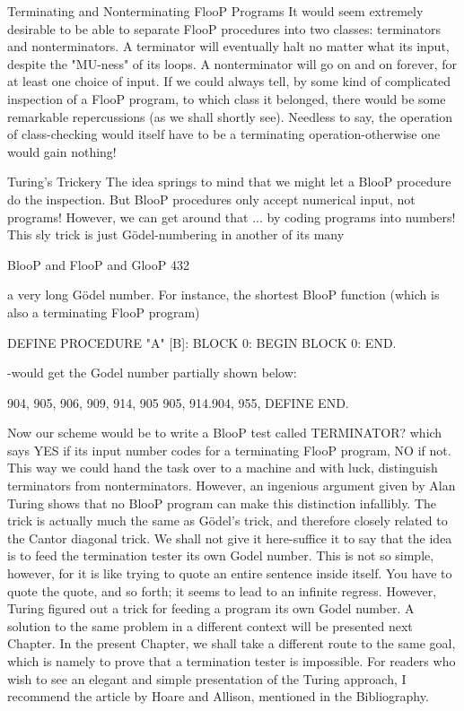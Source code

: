              Terminating and Nonterminating FlooP Programs
It would seem extremely desirable to be able to separate FlooP procedures into two
classes: terminators and nonterminators. A terminator will eventually halt no matter what
its input, despite the "MU-ness" of its loops. A nonterminator will go on and on forever,
for at least one choice of input. If we could always tell, by some kind of complicated
inspection of a FlooP program, to which class it belonged, there would be some
remarkable repercussions (as we shall shortly see). Needless to say, the operation of
class-checking would itself have to be a terminating operation-otherwise
one would gain nothing!

                                  Turing's Trickery
The idea springs to mind that we might let a BlooP procedure do the inspection. But
BlooP procedures only accept numerical input, not programs! However, we can get
around that ... by coding programs into numbers! This sly trick is just Gödel-numbering
in another of its many




BlooP and FlooP and GlooP                                                              432

a very long Gödel number. For instance, the shortest BlooP function (which is also a
terminating FlooP program)

            DEFINE PROCEDURE "A" [B]:
            BLOCK 0: BEGIN
            BLOCK 0: END.

-would get the Godel number partially shown below:

      904, 905, 906, 909, 914, 905           905, 914.904, 955,
      DEFINE                                        END.

      Now our scheme would be to write a BlooP test called TERMINATOR? which
says YES if its input number codes for a terminating FlooP program, NO if not. This way
we could hand the task over to a machine and with luck, distinguish terminators from
nonterminators. However, an ingenious argument given by Alan Turing shows that no
BlooP program can make this distinction infallibly. The trick is actually much the same
as Gödel’s trick, and therefore closely related to the Cantor diagonal trick. We shall not
give it here-suffice it to say that the idea is to feed the termination tester its own Godel
number. This is not so simple, however, for it is like trying to quote an entire sentence
inside itself. You have to quote the quote, and so forth; it seems to lead to an infinite
regress. However, Turing figured out a trick for feeding a program its own Godel
number. A solution to the same problem in a different context will be presented next
Chapter. In the present Chapter, we shall take a different route to the same goal, which is
namely to prove that a termination tester is impossible. For readers who wish to see an
elegant and simple presentation of the Turing approach, I recommend the article by
Hoare and Allison, mentioned in the Bibliography.

